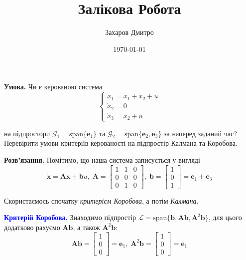 \documentclass[oneside,solution]{karazin-control-assign}
\title{Залікова Робота}
\author{Захаров Дмитро}
\date{\today}
\begin{document}
\maketitle



\hspace{20px}\textbf{Умова.} Чи є керованою система 
\begin{equation}\label{eq:problem_1_condition}
    \begin{cases}
        \dot{x}_1 = x_1 + x_2 + u \\
        \dot{x}_2 = 0 \\
        \dot{x}_3 = x_2 + u
    \end{cases}
\end{equation}

на підпростори $\mathcal{G}_1 = \text{span}\{\mathbf{e}_1\}$ та $\mathcal{G}_2 = \text{span}\{\mathbf{e}_2, \mathbf{e}_3\}$ за наперед заданий час? Перевірити умови критеріїв керованості на підпростір Калмана та Коробова.

\textbf{Розв'язання.} Помітимо, що наша система записується у вигляді
\begin{equation}
    \dot{\mathbf{x}} = \boldsymbol{A}\mathbf{x} + \mathbf{b}u, \; \boldsymbol{A} = \begin{bmatrix}
        1 & 1 & 0 \\
        0 & 0 & 0 \\
        0 & 1 & 0
    \end{bmatrix}, \; \mathbf{b} = \begin{bmatrix}
        1 \\ 0 \\ 1
    \end{bmatrix} = \mathbf{e}_1 + \mathbf{e}_3
\end{equation}

Скористаємось спочатку \textit{критерієм Коробова}, а потім \textit{Калмана}.

\textcolor{blue}{\textbf{Критерій Коробова.}} Знаходимо підпростір $\mathcal{L} = \text{span}\{\mathbf{b}, \boldsymbol{A}\mathbf{b}, \boldsymbol{A}^2\mathbf{b}\}$, для цього додатково рахуємо $\boldsymbol{A}\mathbf{b}$, а також $\boldsymbol{A}^2\mathbf{b}$:
\begin{equation}
    \boldsymbol{A}\mathbf{b} = \begin{bmatrix}
        1 \\ 0 \\ 0
    \end{bmatrix} = \mathbf{e}_1, \; \boldsymbol{A}^2\mathbf{b} = \begin{bmatrix}
        1 \\ 0 \\ 0
    \end{bmatrix} = \mathbf{e}_1
\end{equation}
\end{document}
